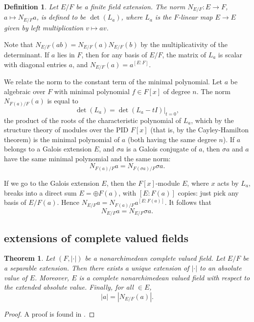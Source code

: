 \documentclass{amsart}
\newtheorem{definition}[equation]{Definition}
\newtheorem{theorem}[equation]{Theorem}
\def\abs#1{{|#1|}}
\begin{document}
\begin{definition}
  Let $E/F$ be a finite field extension.  The norm $N_{E/F}:E\to F$,
  $a\mapsto N_{E/F}a$, is defined to be $\det(L_a)$, where $L_a$ is
  the $F$-linear map $E\to E$ given by left multiplication $v\mapsto a
  v$.
\end{definition}

Note that $N_{E/F}(a b) = N_{E/F}(a) N_{E/F}(b)$ by the
multiplicativity of the determinant.  If $a$ lies in $F$, then for any
basis of $E/F$, the matrix of $L_a$
is scalar with diagonal entries $a$, and
$N_{E/F}(a) = a^{[E:F]}$.  

We relate the norm to the constant term of the minimal polynomial.  
Let $a$ be algebraic over $F$ with minimal polynomial
$f\in F[x]$ of degree $n$.  The norm $N_{F(a)/F}(a)$ is
equal to
\[
\det(L_a) = \det(L_a - t I)|_{t=0},
\]
the product of the roots of the characteristic polynomial of $L_a$,
which by the structure theory of modules over the PID $F[x]$ (that is, by the
Cayley-Hamilton theorem) is the
minimal polynomial of $a$ (both having the same degree $n$).  If $a$
belongs to a Galois extension $E$, and $\sigma a$ is a Galois
conjugate of $a$, then $\sigma a$ and $a$ have the same minimal
polynomial and the same norm:
\[
N_{F(a)/F}a = N_{F(\sigma a)/F}\sigma a.
\]

If we go to the Galois extension $E$, then the $F[x]$-module $E$, where $x$
acts by $L_a$, breaks into a direct sum $E = \oplus F(a)$, with $[E:F(a)]$ copies:
just pick any basis of $E/F(a)$.
Hence $N_{E/F}a = N_{F(a)/F} a^{[E:F(a)]}$.  It follows that
\[
N_{E/F}a = N_{E/F} \sigma a.
\]


\subsection{extensions of complete valued fields}



\begin{theorem}  Let $(F,\abs{\cdot})$ be a nonarchimedean complete valued field.  Let $E/F$
be a separable extension.  Then there exists a unique extension of $\abs{\cdot}$
to an absolute value of $E$.  Moreover, $E$ is a complete nonarchimedean valued field with
respect to the extended absolute value. Finally,
for all $\in E$, 
\[
\abs{a} = \abs{N_{E/F}(a)}.
\]
\end{theorem}

\begin{proof}  A proof is found in \cite[6.33]{knapp-advanced}.
\end{proof}
\end{document}
